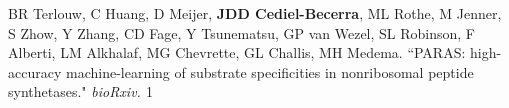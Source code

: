  \vspace{-2mm}

\begin{cvpubs}


\cvpub
{BR Terlouw, C Huang, D Meijer, \textbf{JDD Cediel-Becerra}, ML Rothe, M Jenner, S Zhow, Y Zhang, CD Fage, Y Tsunematsu, GP van Wezel, SL Robinson, F Alberti, LM Alkhalaf, MG Chevrette, GL Challis, MH Medema. ``PARAS: high-accuracy machine-learning of substrate specificities in nonribosomal peptide synthetases." \textit{bioRxiv. \textbf{}}}
{1}


\end{cvpubs}
